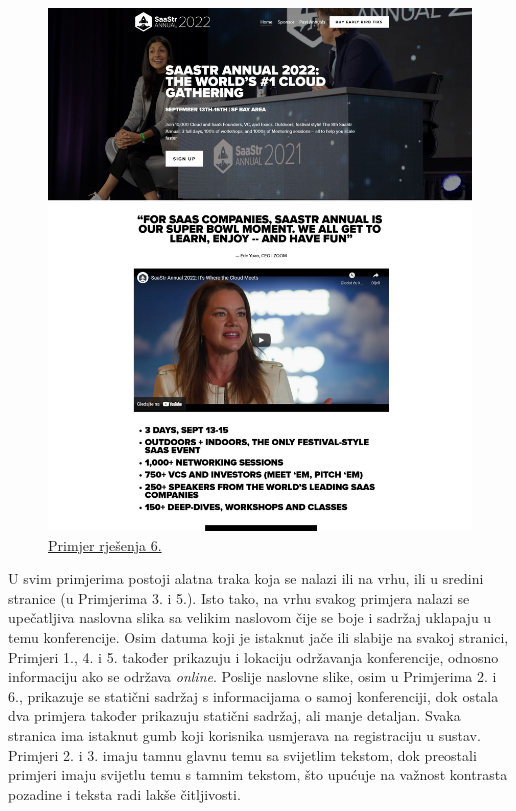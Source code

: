 \begin{figure}[H]
\begin{minipage}[t]{0.4\textwidth}
				\includegraphics[width=\linewidth]{slike/frontpage_example6}
				\caption{\href{https://www.saastrannual2022.com//}{Primjer rješenja 6.}} \label{fig:frontpage_example6}
			\end{minipage}
		\end{figure}
		
	
		U svim primjerima postoji alatna traka koja se nalazi ili na vrhu, ili u sredini stranice (u Primjerima 3. i 5.). Isto tako, na vrhu svakog primjera nalazi se upečatljiva naslovna slika sa velikim naslovom čije se boje i sadržaj uklapaju u temu konferencije. Osim datuma koji je istaknut jače ili slabije na svakoj stranici, Primjeri 1., 4. i 5. također prikazuju i lokaciju održavanja konferencije, odnosno informaciju ako se održava \textit{online}. Poslije naslovne slike, osim u Primjerima 2. i 6., prikazuje se statični sadržaj s informacijama o samoj konferenciji, dok ostala dva primjera također prikazuju statični sadržaj, ali manje detaljan. Svaka stranica ima istaknut gumb koji korisnika usmjerava na registraciju u sustav. Primjeri 2. i 3. imaju tamnu glavnu temu sa svijetlim tekstom, dok preostali primjeri imaju svijetlu temu s tamnim tekstom, što upućuje na važnost kontrasta pozadine i teksta radi lakše čitljivosti. 
			
		\eject
		
	